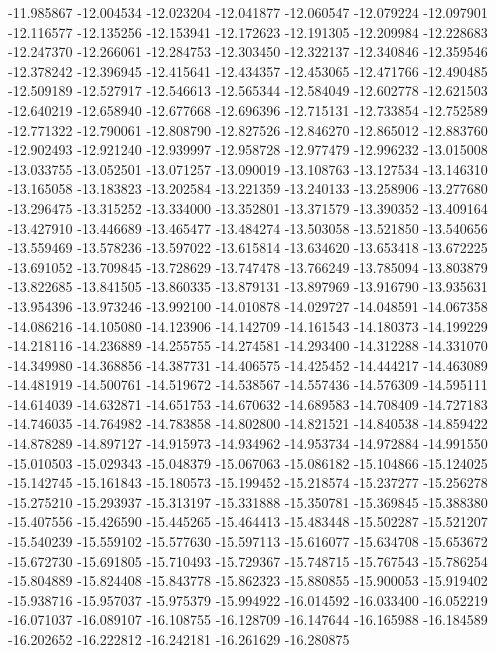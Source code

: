 -11.985867
-12.004534
-12.023204
-12.041877
-12.060547
-12.079224
-12.097901
-12.116577
-12.135256
-12.153941
-12.172623
-12.191305
-12.209984
-12.228683
-12.247370
-12.266061
-12.284753
-12.303450
-12.322137
-12.340846
-12.359546
-12.378242
-12.396945
-12.415641
-12.434357
-12.453065
-12.471766
-12.490485
-12.509189
-12.527917
-12.546613
-12.565344
-12.584049
-12.602778
-12.621503
-12.640219
-12.658940
-12.677668
-12.696396
-12.715131
-12.733854
-12.752589
-12.771322
-12.790061
-12.808790
-12.827526
-12.846270
-12.865012
-12.883760
-12.902493
-12.921240
-12.939997
-12.958728
-12.977479
-12.996232
-13.015008
-13.033755
-13.052501
-13.071257
-13.090019
-13.108763
-13.127534
-13.146310
-13.165058
-13.183823
-13.202584
-13.221359
-13.240133
-13.258906
-13.277680
-13.296475
-13.315252
-13.334000
-13.352801
-13.371579
-13.390352
-13.409164
-13.427910
-13.446689
-13.465477
-13.484274
-13.503058
-13.521850
-13.540656
-13.559469
-13.578236
-13.597022
-13.615814
-13.634620
-13.653418
-13.672225
-13.691052
-13.709845
-13.728629
-13.747478
-13.766249
-13.785094
-13.803879
-13.822685
-13.841505
-13.860335
-13.879131
-13.897969
-13.916790
-13.935631
-13.954396
-13.973246
-13.992100
-14.010878
-14.029727
-14.048591
-14.067358
-14.086216
-14.105080
-14.123906
-14.142709
-14.161543
-14.180373
-14.199229
-14.218116
-14.236889
-14.255755
-14.274581
-14.293400
-14.312288
-14.331070
-14.349980
-14.368856
-14.387731
-14.406575
-14.425452
-14.444217
-14.463089
-14.481919
-14.500761
-14.519672
-14.538567
-14.557436
-14.576309
-14.595111
-14.614039
-14.632871
-14.651753
-14.670632
-14.689583
-14.708409
-14.727183
-14.746035
-14.764982
-14.783858
-14.802800
-14.821521
-14.840538
-14.859422
-14.878289
-14.897127
-14.915973
-14.934962
-14.953734
-14.972884
-14.991550
-15.010503
-15.029343
-15.048379
-15.067063
-15.086182
-15.104866
-15.124025
-15.142745
-15.161843
-15.180573
-15.199452
-15.218574
-15.237277
-15.256278
-15.275210
-15.293937
-15.313197
-15.331888
-15.350781
-15.369845
-15.388380
-15.407556
-15.426590
-15.445265
-15.464413
-15.483448
-15.502287
-15.521207
-15.540239
-15.559102
-15.577630
-15.597113
-15.616077
-15.634708
-15.653672
-15.672730
-15.691805
-15.710493
-15.729367
-15.748715
-15.767543
-15.786254
-15.804889
-15.824408
-15.843778
-15.862323
-15.880855
-15.900053
-15.919402
-15.938716
-15.957037
-15.975379
-15.994922
-16.014592
-16.033400
-16.052219
-16.071037
-16.089107
-16.108755
-16.128709
-16.147644
-16.165988
-16.184589
-16.202652
-16.222812
-16.242181
-16.261629
-16.280875
